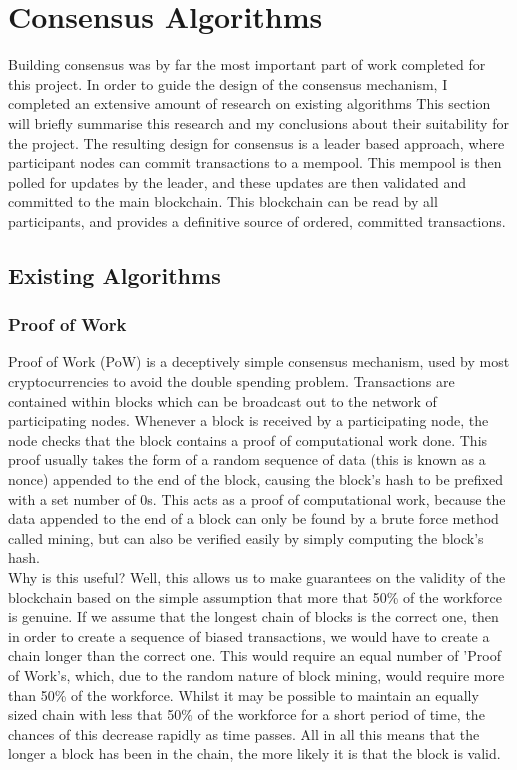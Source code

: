 \documentclass[12pt,a4paper,twoside,openright]{report}
\begin{document}
	\section{Consensus Algorithms}
	Building consensus was by far the most important part of work completed for this project. 
	In order to guide the design of the consensus mechanism, I completed an extensive amount of research on existing algorithms
	This section will briefly summarise this research and my conclusions about their suitability for the project. 
	The resulting design for consensus is a leader based approach, where participant nodes can commit transactions to a mempool.
	This mempool is then polled for updates by the leader, and these updates are then validated and committed to the main blockchain.
	This blockchain can be read by all participants, and provides a definitive source of ordered, committed transactions.

		\subsection*{Existing Algorithms}
			\subsubsection*{Proof of Work}
			Proof of Work (PoW) is a deceptively simple consensus mechanism, used by most cryptocurrencies to avoid the double spending problem.
			Transactions are contained within blocks which can be broadcast out to the network of participating nodes. 
			Whenever a block is received by a participating node, the node checks that the block contains a proof of computational work done. 
			This proof usually takes the form of a random sequence of data (this is known as a nonce) appended to the end of the block, causing the block's hash to be prefixed with a set number of 0s.
			This acts as a proof of computational work, because the data appended to the end of a block can only be found by a brute force method called mining, but can also be verified easily by simply computing the block's hash.\\
			
			Why is this useful? 
			Well, this allows us to make guarantees on the validity of the blockchain based on the simple assumption that more that 50\% of the workforce is genuine.
			If we assume that the longest chain of blocks is the correct one, then in order to create a sequence of biased transactions, we would have to create a chain longer than the correct one. 
			This would require an equal number of 'Proof of Work's, which, due to the random nature of block mining, would require more than 50\% of the workforce.
			Whilst it may be possible to maintain an equally sized chain with less that 50\% of the workforce for a short period of time, the chances of this decrease rapidly as time passes.
			All in all this means that the longer a block has been in the chain, the more likely it is that the block is valid.\\
\end{document}
